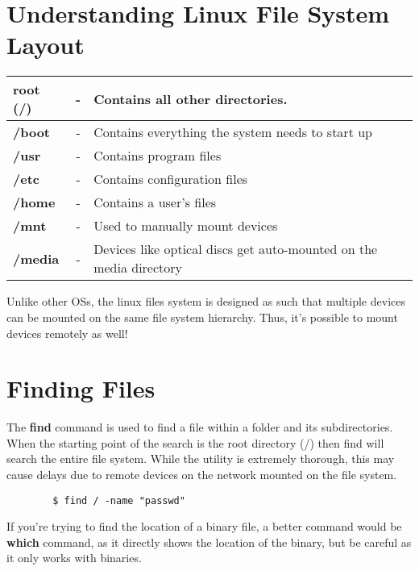 \documentclass{report}
\begin{document}
	\section{Understanding Linux File System Layout}
	\begin{tabular}{lcl}
		\toprule
		\textbf{root (/)} &- &Contains all other directories. \\
		\midrule
		\hspace{10pt}
		\textbf{/boot} &- &Contains everything the system needs to start up\\
		\hspace{10pt}
		\textbf{/usr} &- &Contains program files\\
		\hspace{10pt}
		\textbf{/etc} &- &Contains configuration files\\
		\hspace{10pt}
		\textbf{/home} &- &Contains a user's files\\
		\hspace{10pt}
		\textbf{/mnt} &- &Used to manually mount devices \\
		\hspace{10pt}
		\textbf{/media} &- &Devices like optical discs get auto-mounted on the media directory \\
		\bottomrule
	\end{tabular}

	\noindent
	Unlike other OSs, the linux files system is designed as such that multiple devices can be mounted on the same file system hierarchy. Thus, it's possible to mount devices remotely as well!
	
	\section{Finding Files}
	The \textbf{find} command is used to find a file within a folder and its subdirectories. When the starting point of the search is the root directory (/) then find will search the entire file system. While the utility is extremely thorough, this may cause delays due to remote devices on the network mounted on the file system. 
	
	\begin{verbatim}
		$ find / -name "passwd"
	\end{verbatim}
	
	\noindent
	If you're trying to find the location of a binary file, a better command would be \textbf{which} command, as it directly shows the location of the binary, but be careful as it only works with binaries.
	
\end{document}
